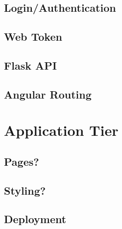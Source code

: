 \subsection{Login/Authentication}
\subsection{Web Token}
\subsection{Flask API}
\subsection{Angular Routing}

\section{Application Tier}
\subsection{Pages?}
\subsection{Styling?}
\subsection{Deployment}